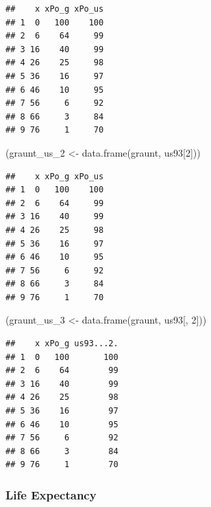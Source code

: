 \documentclass[
]{article}
\newenvironment{Shaded}{\begin{snugshade}}{\end{snugshade}}
\newcommand{\AttributeTok}[1]{\textcolor[rgb]{0.77,0.63,0.00}{#1}}
\newcommand{\DecValTok}[1]{\textcolor[rgb]{0.00,0.00,0.81}{#1}}
\newcommand{\FunctionTok}[1]{\textcolor[rgb]{0.00,0.00,0.00}{#1}}
\newcommand{\NormalTok}[1]{#1}
\newcommand{\OtherTok}[1]{\textcolor[rgb]{0.56,0.35,0.01}{#1}}
\newcommand{\SpecialCharTok}[1]{\textcolor[rgb]{0.00,0.00,0.00}{#1}}
\begin{document}
\begin{Shaded}
\end{Shaded}

\begin{verbatim}
##    x xPo_g xPo_us
## 1  0   100    100
## 2  6    64     99
## 3 16    40     99
## 4 26    25     98
## 5 36    16     97
## 6 46    10     95
## 7 56     6     92
## 8 66     3     84
## 9 76     1     70
\end{verbatim}

\begin{Shaded}
\begin{Highlighting}[]
\NormalTok{(graunt\_us\_2 }\OtherTok{\textless{}{-}} \FunctionTok{data.frame}\NormalTok{(graunt, us93[}\DecValTok{2}\NormalTok{]))}
\end{Highlighting}
\end{Shaded}

\begin{verbatim}
##    x xPo_g xPo_us
## 1  0   100    100
## 2  6    64     99
## 3 16    40     99
## 4 26    25     98
## 5 36    16     97
## 6 46    10     95
## 7 56     6     92
## 8 66     3     84
## 9 76     1     70
\end{verbatim}

\begin{Shaded}
\begin{Highlighting}[]
\NormalTok{(graunt\_us\_3 }\OtherTok{\textless{}{-}} \FunctionTok{data.frame}\NormalTok{(graunt, us93[, }\DecValTok{2}\NormalTok{]))}
\end{Highlighting}
\end{Shaded}

\begin{verbatim}
##    x xPo_g us93...2.
## 1  0   100       100
## 2  6    64        99
## 3 16    40        99
## 4 26    25        98
## 5 36    16        97
## 6 46    10        95
## 7 56     6        92
## 8 66     3        84
## 9 76     1        70
\end{verbatim}

\hypertarget{life-expectancy}{%
\subsubsection{Life Expectancy}\label{life-expectancy}}
\end{document}
